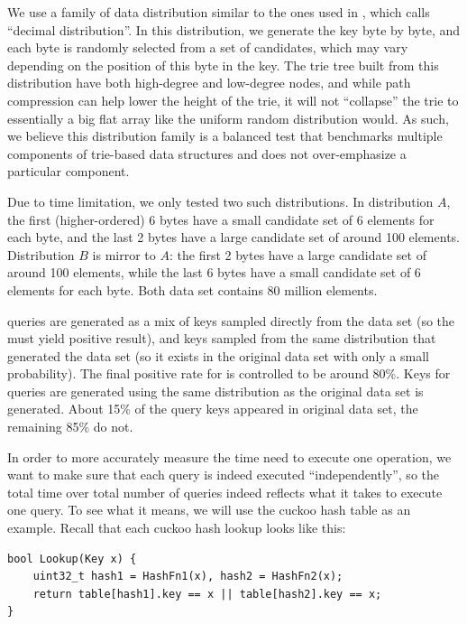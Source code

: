 \documentclass[11pt, usletter]{article}
\begin{document}
We use a family of data distribution similar to the ones used in \cite{masstree}, which \cite{masstree} calls ``decimal distribution''. 
In this distribution, we generate the key byte by byte, and each byte is randomly selected from a set of candidates, 
which may vary depending on the position of this byte in the key.
The trie tree built from this distribution have both high-degree and low-degree nodes, 
and while path compression can help lower the height of the trie, it will not ``collapse'' the trie 
to essentially a big flat array like the uniform random distribution would. 
As such, we believe this distribution family is a balanced test that 
benchmarks multiple components of trie-based data structures and does not over-emphasize a particular component. 

Due to time limitation, we only tested two such distributions. 
In distribution $A$, the first (higher-ordered) 6 bytes have a small candidate set of 6 elements for each byte, 
and the last 2 bytes have a large candidate set of around 100 elements. 
Distribution $B$ is mirror to $A$: the first 2 bytes have a large candidate set of around 100 elements,
while the last 6 bytes have a small candidate set of 6 elements for each byte.
Both data set contains 80 million elements.

\lookup queries are generated as a mix of keys sampled directly from the data set (so the \lookup must yield positive result),
and keys sampled from the same distribution that generated the data set (so it exists in the original data set 
with only a small probability). The final positive rate for \lookup is controlled to be around 80\%. 
Keys for \lowerbound queries are generated using the same distribution as the original data set is generated. 
About 15\% of the \lowerbound query keys appeared in original data set, the remaining 85\% do not. 

In order to more accurately measure the time need to execute one operation, 
we want to make sure that each query is indeed executed ``independently'', 
so the total time over total number of queries indeed reflects what it takes to execute one query. 
To see what it means, we will use the cuckoo hash table as an example. 
Recall that each cuckoo hash lookup looks like this:

\singlespacing\begin{codebox}
\begin{verbatim}
bool Lookup(Key x) {
    uint32_t hash1 = HashFn1(x), hash2 = HashFn2(x);
    return table[hash1].key == x || table[hash2].key == x;
}
\end{verbatim}
\end{codebox}\doublespacing
\end{document}
